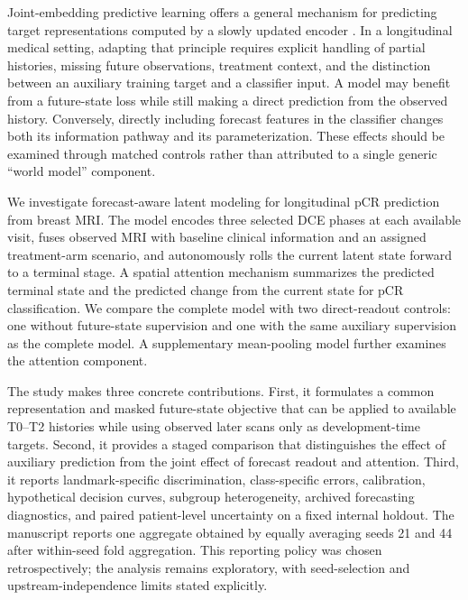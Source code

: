 Joint-embedding predictive learning offers a general mechanism for predicting target representations computed by a slowly updated encoder \citep{jepa2023}. In a longitudinal medical setting, adapting that principle requires explicit handling of partial histories, missing future observations, treatment context, and the distinction between an auxiliary training target and a classifier input. A model may benefit from a future-state loss while still making a direct prediction from the observed history. Conversely, directly including forecast features in the classifier changes both its information pathway and its parameterization. These effects should be examined through matched controls rather than attributed to a single generic ``world model'' component.

We investigate forecast-aware latent modeling for longitudinal pCR prediction from breast MRI. The model encodes three selected DCE phases at each available visit, fuses observed MRI with baseline clinical information and an assigned treatment-arm scenario, and autonomously rolls the current latent state forward to a terminal stage. A spatial attention mechanism summarizes the predicted terminal state and the predicted change from the current state for pCR classification. We compare the complete model with two direct-readout controls: one without future-state supervision and one with the same auxiliary supervision as the complete model. A supplementary mean-pooling model further examines the attention component.

The study makes three concrete contributions. First, it formulates a common representation and masked future-state objective that can be applied to available T0--T2 histories while using observed later scans only as development-time targets. Second, it provides a staged comparison that distinguishes the effect of auxiliary prediction from the joint effect of forecast readout and attention. Third, it reports landmark-specific discrimination, class-specific errors, calibration, hypothetical decision curves, subgroup heterogeneity, archived forecasting diagnostics, and paired patient-level uncertainty on a fixed internal holdout. The manuscript reports one aggregate obtained by equally averaging seeds 21 and 44 after within-seed fold aggregation. This reporting policy was chosen retrospectively; the analysis remains exploratory, with seed-selection and upstream-independence limits stated explicitly.
